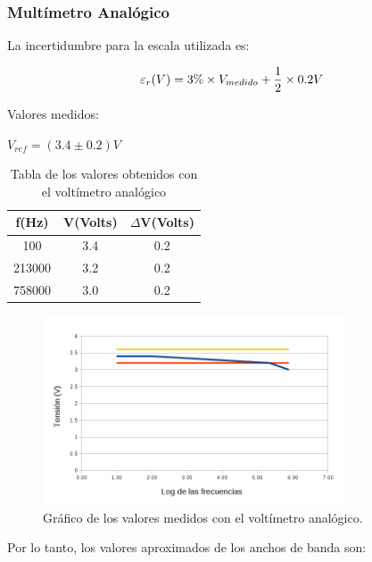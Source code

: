 \documentclass{article}
\begin{document}
\subsubsection{Multímetro Analógico}


La incertidumbre para la escala utilizada es:

\begin{equation}
 	\varepsilon_r(V) = 3\%\times V_{medido} + {1 \over 2}\times 0.2V
\end{equation}
\medskip

Valores medidos:

\begin{center}
$V_{ref} = (3.4 \pm 0.2) V$
\end{center}

\begin{table}[!hbt]
	\begin{center}
	\begin{tabular}{|c|c|c|}\hline
	\textbf{f(Hz)} & \textbf{V(Volts)} & \textbf{$\Delta$V(Volts)} \\ \hline
	100 & 3.4 & 0.2\\ \hline
    213000 & 3.2 & 0.2\\ \hline
    758000 & 3.0 & 0.2\\ \hline
	\end{tabular}
	\caption{Tabla de los valores obtenidos con el voltímetro analógico}
	\end{center}
\end{table}
\bigskip


\begin{figure}[h!tbp]
\centering
\includegraphics[width=0.80\textwidth]{images/tablaANA.png}
\caption{Gráfico de los valores medidos con el voltímetro analógico.}
\end{figure}
\bigskip

Por lo tanto, los valores aproximados de los anchos de banda son:
\end{document}
